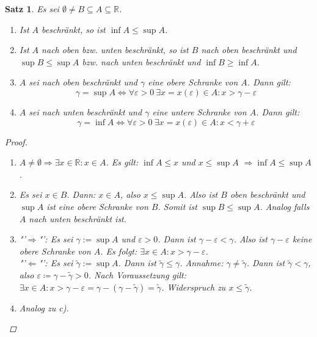 \documentclass[12pt]{extreport} %
\newcommand{\R}{\mathbb{R}}
\theoremstyle{named}
\theoremstyle{itshape}
\newtheorem{satz}[unnamedtheorem]{Satz}
\theoremstyle{normal}
\begin{document}
\begin{satz} \label{1.2:satz}
	Es sei $\emptyset \neq B \subseteq A \subseteq \R$. 
	\begin{enumerate}
		\item Ist $A$ beschränkt, so ist $\inf A \leq \sup A$.
		\item Ist $A$ nach oben bzw. unten beschränkt, so ist $B$ nach oben beschränkt und $\sup B \leq \sup A$ bzw. nach unten beschränkt und $\inf B \geq \inf A$.
		\item $A$ sei nach oben beschränkt und $\gamma$ eine obere Schranke von $A$. Dann gilt:
			$$
				\gamma = \sup A \iff \forall \varepsilon > 0 ~\exists x = x(\varepsilon) \in A : x > \gamma - \varepsilon
			$$
		\item $A$ sei nach unten beschränkt und $\gamma$ eine untere Schranke von $A$. Dann gilt:
			$$
				\gamma = \inf A \iff \forall \varepsilon > 0 ~\exists x = x(\varepsilon) \in A : x < \gamma + \varepsilon
			$$	
	\end{enumerate}

	\begin{proof} ~\ 
		\begin{enumerate}
			\item $A \neq \emptyset \Rightarrow \exists x \in \R : x \in A$. Es gilt: $\inf A \leq x$ und $x \leq \sup A$ $ \Rightarrow \inf A \leq \sup A $.
			\item Es sei $x \in B$. Dann: $x \in A$, also $x \leq \sup A$. Also ist $B$ oben beschränkt und $\sup A$ ist eine obere Schranke von $B$. Somit ist
			      $\sup B \leq \sup A $. Analog falls $A$ nach unten beschränkt ist.
			\item "'$\Rightarrow$"': Es sei $\gamma := \sup A$ und $\varepsilon > 0$. Dann ist $\gamma - \varepsilon < \gamma$. Also ist $\gamma - \varepsilon$ keine obere 
			        Schranke von $A$. Es folgt: $\exists x \in A : x > \gamma - \varepsilon$. \\
				"'$\Leftarrow$"': Es sei $\tilde{\gamma} := \sup A$. Dann ist $\tilde{\gamma} \leq \gamma$. Annahme: $\gamma \neq \tilde{\gamma}$. Dann ist 
				$\tilde{\gamma} < \gamma$, also	$\varepsilon \coloneqq \gamma - \tilde{\gamma} > 0$. Nach Voraussetzung gilt: 
				$\exists x \in A: x > \gamma - \varepsilon = \gamma- (\gamma - \tilde{\gamma}) = \tilde{\gamma}$. Widerspruch zu $x \leq \tilde{\gamma}$.
			\item Analog zu c).
		\end{enumerate}
	\end{proof}
\end{satz}
\end{document}
